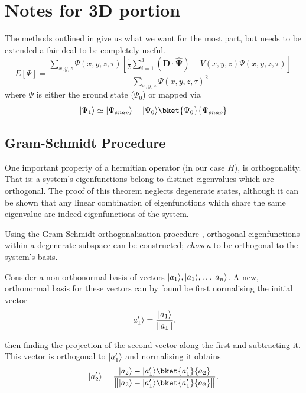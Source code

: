 \section{Notes for 3D portion}
The methods outlined in \cite{Strickland2010} give us what we want for the most part, but needs to be extended a fair deal to be completely useful.
\begin{equation}
E[\Psi] = \frac{\sum_{x,y,z}\Psi(x,y,z,\tau)\left[\frac{1}{2}\sum_{i=1}^3\left(\mathbf{D\cdot\widehat{\Psi}}\right)-V(x,y,z)\Psi(x,y,z,\tau)\right]}{\sum_{x,y,z}\Psi(x,y,z,\tau)^2}
\end{equation}
where $\Psi$ is either the ground state ($\Psi_0$) or mapped via
\begin{equation}
 \ket{\Psi_1} \simeq \ket{\Psi_{snap}} - \ket{\Psi_0}\bket{\Psi_0}{\Psi_{snap}}
\end{equation}

\subsection{Gram-Schmidt Procedure}\label{subsec:gsp}

One important property of a hermitian operator (in our case $H$), is orthogonality. That is: a system's eigenfunctions belong to distinct eigenvalues which are orthogonal.
The proof of this theorem neglects degenerate states, although it can be shown that any linear combination of eigenfunctions which share the same eigenvalue are indeed eigenfunctions of the system.

Using the Gram-Schmidt orthogonalisation procedure \cite{Gram1883, Schmidt1907}, orthogonal eigenfunctions within a degenerate subspace can be constructed; \textit{chosen} to be orthogonal to the system's basis.

Consider a non-orthonormal basis of vectors $\lvert a_1\rangle, \lvert a_1\rangle, \ldots \lvert a_n\rangle$.
A new, orthonormal basis for these vectors can by found be first normalising the initial vector
\begin{equation}
\lvert a^\prime_1\rangle = \frac{\lvert a_1\rangle}{\lVert a_1\rVert},
\end{equation}

then finding the projection of the second vector along the first and subtracting it.
This vector is orthogonal to $\lvert a^\prime_1\rangle$ and normalising it obtains
\begin{equation}
\ket{a^\prime_2} = \frac{\ket{a_2}-\ket{a^\prime_1}\bket{a^\prime_1}{a_2}}{\norm[\big]{\ket{a_2}-\ket{a^\prime_1}\bket{a^\prime_1}{a_2}}}.
\end{equation}

